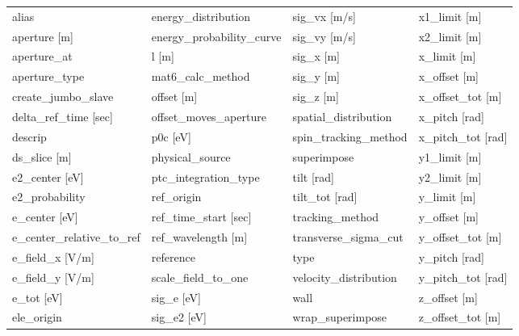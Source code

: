  \begin{tabular}{llll} \toprule
alias                            & energy_distribution              & sig_vx [m/s]                     & x1_limit [m]                     \\
aperture [m]                     & energy_probability_curve         & sig_vy [m/s]                     & x2_limit [m]                     \\
aperture_at                      & l [m]                            & sig_x [m]                        & x_limit [m]                      \\
aperture_type                    & mat6_calc_method                 & sig_y [m]                        & x_offset [m]                     \\
create_jumbo_slave               & offset [m]                       & sig_z [m]                        & x_offset_tot [m]                 \\
delta_ref_time [sec]             & offset_moves_aperture            & spatial_distribution             & x_pitch [rad]                    \\
descrip                          & p0c [eV]                         & spin_tracking_method             & x_pitch_tot [rad]                \\
ds_slice [m]                     & physical_source                  & superimpose                      & y1_limit [m]                     \\
e2_center [eV]                   & ptc_integration_type             & tilt [rad]                       & y2_limit [m]                     \\
e2_probability                   & ref_origin                       & tilt_tot [rad]                   & y_limit [m]                      \\
e_center [eV]                    & ref_time_start [sec]             & tracking_method                  & y_offset [m]                     \\
e_center_relative_to_ref         & ref_wavelength [m]               & transverse_sigma_cut             & y_offset_tot [m]                 \\
e_field_x [V/m]                  & reference                        & type                             & y_pitch [rad]                    \\
e_field_y [V/m]                  & scale_field_to_one               & velocity_distribution            & y_pitch_tot [rad]                \\
e_tot [eV]                       & sig_e [eV]                       & wall                             & z_offset [m]                     \\
ele_origin                       & sig_e2 [eV]                      & wrap_superimpose                 & z_offset_tot [m]                 \\
 \bottomrule
 \end{tabular}
 \vfill
 
